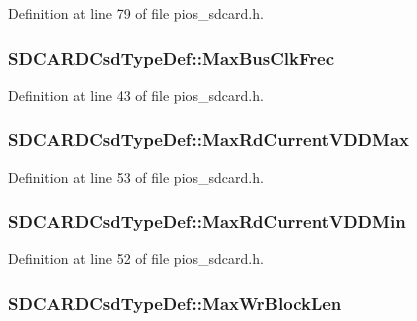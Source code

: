 Definition at line 79 of file pios\-\_\-sdcard.\-h.

\hypertarget{group___p_i_o_s___s_d_c_a_r_d_ga9413a0371dfa0c4bf305c922b10392f1}{
\subsubsection[{Max\-Bus\-Clk\-Frec}]{ S\-D\-C\-A\-R\-D\-Csd\-Type\-Def\-::\-Max\-Bus\-Clk\-Frec}}\label{group___p_i_o_s___s_d_c_a_r_d_ga9413a0371dfa0c4bf305c922b10392f1}


Definition at line 43 of file pios\-\_\-sdcard.\-h.

\hypertarget{group___p_i_o_s___s_d_c_a_r_d_ga3ba17f2a67a38414d67aaad8d7cc99be}{
\subsubsection[{Max\-Rd\-Current\-V\-D\-D\-Max}]{ S\-D\-C\-A\-R\-D\-Csd\-Type\-Def\-::\-Max\-Rd\-Current\-V\-D\-D\-Max}}\label{group___p_i_o_s___s_d_c_a_r_d_ga3ba17f2a67a38414d67aaad8d7cc99be}


Definition at line 53 of file pios\-\_\-sdcard.\-h.

\hypertarget{group___p_i_o_s___s_d_c_a_r_d_ga44848558ce422fd005494fcb94656fa8}{
\subsubsection[{Max\-Rd\-Current\-V\-D\-D\-Min}]{ S\-D\-C\-A\-R\-D\-Csd\-Type\-Def\-::\-Max\-Rd\-Current\-V\-D\-D\-Min}}\label{group___p_i_o_s___s_d_c_a_r_d_ga44848558ce422fd005494fcb94656fa8}


Definition at line 52 of file pios\-\_\-sdcard.\-h.

\hypertarget{group___p_i_o_s___s_d_c_a_r_d_gac00127b98cb9a3a0e1a0bc7960570992}{
\subsubsection[{Max\-Wr\-Block\-Len}]{ S\-D\-C\-A\-R\-D\-Csd\-Type\-Def\-::\-Max\-Wr\-Block\-Len}}\label{group___p_i_o_s___s_d_c_a_r_d_gac00127b98cb9a3a0e1a0bc7960570992}


